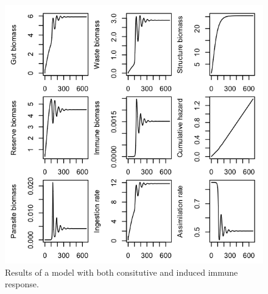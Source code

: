 \documentclass[12pt,reqno,final,pdftex]{amsart}\usepackage[]{graphicx}\usepackage[]{color}
\newenvironment{knitrout}{}{} %
\theoremstyle{plain}
\numberwithin{equation}{part}
\begin{document}
\begin{knitrout}\scriptsize
{}\color{fgcolor}\begin{figure}

\includegraphics[width=\linewidth]{figure/unnamed-chunk-3-1} \hfill{}

\caption[Results of a model with both consitutive and induced immune response]{Results of a model with both consitutive and induced immune response.\label{fig:unnamed-chunk-3}}
\end{figure}


\end{knitrout}
\end{document}
